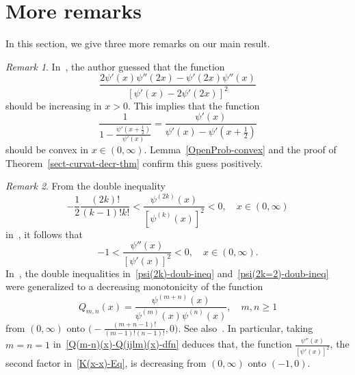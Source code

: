 \documentclass[reqno]{amsart}%
\theoremstyle{plain}
\theoremstyle{remark}
\newtheorem{rem}{Remark}
\begin{document}
\section{More remarks}
In this section, we give three more remarks on our main result.

\begin{rem}
In~\cite[Remark~6.5]{Alice-y-x-curv-notes.tex}, the author guessed that the function
\begin{equation*}
\frac{2\psi'(x)\psi''(2x)-\psi'(2x)\psi''(x)}{[\psi'(x)-2\psi'(2x)]^2}
\end{equation*}
should be increasing in $x>0$. This implies that the function
\begin{equation*}
\frac{1}{1-\frac{\psi'(x+\frac{1}{2})}{\psi'(x)}}=\frac{\psi'(x)}{\psi'(x)-\psi'(x+\frac{1}{2})}
\end{equation*}
should be convex in $x\in(0,\infty)$. Lemma~\ref{OpenProb-convex} and the proof of Theorem~\ref{sect-curvat-decr-thm} confirm this guess positively.
\end{rem}

\begin{rem}
From the double inequality
\begin{equation}\label{psi(2k)-doub-ineq}
-\frac{1}{2}\frac{(2k)!}{(k-1)!k!}<\frac{\psi^{(2k)}(x)}{[\psi^{(k)}(x)]^2}<0, \quad x\in(0,\infty)
\end{equation}
in~\cite[Theorem~3.2]{RIMA-D-20-01130.tex}, it follows that
\begin{equation}\label{psi(2k=2)-doub-ineq}
-1<\frac{\psi''(x)}{[\psi'(x)]^2}<0, \quad x\in(0,\infty).
\end{equation}
In~\cite[Theorem~11]{Alice-y-x-conj-one.tex}, the double inequalities in~\eqref{psi(2k)-doub-ineq} and~\eqref{psi(2k=2)-doub-ineq} were generalized to a decreasing monotonicity of the function
\begin{equation}\label{Q(m-n)(x)-Q(ijlm)(x)-dfn}
Q_{m,n}(x)=\frac{\psi^{(m+n)}(x)}{\psi^{(m)}(x)\psi^{(n)}(x)}, \quad m,n\ge1
\end{equation}
from $(0,\infty)$ onto $\bigl(-\frac{(m+n-1)!} {(m-1)!(n-1)!},0\bigr)$. See also~\cite[Sections~9 and~12]{manifold-gamma.tex}. In particular, taking $m=n=1$ in~\eqref{Q(m-n)(x)-Q(ijlm)(x)-dfn} deduces that, the function $\frac{\psi''(x)}{[\psi'(x)]^2}$, the second factor in~\eqref{K(x-x)-Eq}, is decreasing from $(0,\infty)$ onto $(-1,0)$.
\end{rem}
\end{document}
